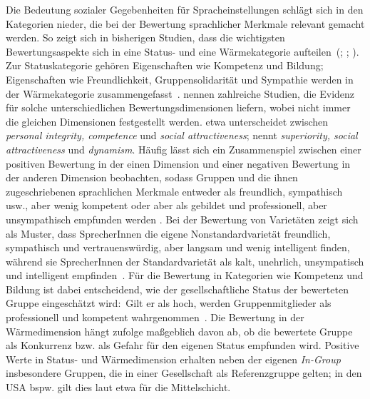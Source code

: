 Die Bedeutung sozialer Gegebenheiten für Spracheinstellungen schlägt sich in den Kategorien nieder, die bei der Bewertung sprachlicher Merkmale relevant gemacht werden.  
So zeigt sich in bisherigen Studien, dass die wichtigsten Bewertungsaspekte sich in eine Status- und eine Wärmekategorie aufteilen~(\citealp[s.][155]{Creber.1983}; \citealp[49]{Preston2004}; \citealp[]{Fiske.2002}). 
Zur Statuskategorie gehören Eigenschaften wie Kompetenz und Bildung;  
Eigenschaften wie Freundlichkeit, Gruppensolidarität und Sympathie werden in der Wärmekategorie zusammengefasst~\citep[s.][182]{Plewnia.2011}.
\citet[223--224]{Cargile.1994} nennen zahlreiche Studien, die Evidenz f{\"u}r solche unterschiedlichen Bewertungsdimensionen liefern, wobei nicht immer die gleichen Dimensionen festgestellt werden. \citet{Lambert.1967} etwa unterscheidet zwischen \textit{personal integrity, competence} und \textit{social attractiveness}; 
\citet[117]{Garrett.2007} nennt \textit{superiority, social attractiveness} und \textit{dynamism}. 
Häufig lässt sich ein Zusammenspiel zwischen einer positiven Bewertung in der einen Dimension und einer negativen Bewertung in der anderen Dimension beobachten, sodass Gruppen und die ihnen zugeschriebenen sprachlichen Merkmale entweder als freundlich, sympathisch usw., aber wenig kompetent oder aber als gebildet und professionell, aber unsympathisch empfunden werden \citep[s.][878--879]{Fiske.2002}.
Bei der Bewertung von Variet{\"a}ten zeigt sich als Muster, dass SprecherInnen die eigene  Nonstandardvariet{\"a}t freundlich, sympathisch und vertrauensw{\"u}rdig, aber langsam und wenig intelligent finden, w{\"a}hrend sie SprecherInnen der Standardvariet{\"a}t als kalt, unehrlich, unsympatisch und intelligent empfinden~\citep[s.][1687]{Preston2005}.
F{\"u}r die Bewertung in Kategorien wie Kompetenz und Bildung ist dabei entscheidend, wie der gesellschaftliche Status der bewerteten Gruppe eingesch{\"a}tzt wird:~Gilt er als hoch, werden Gruppenmitglieder als professionell und kompetent wahrgenommen~\citep[897]{Fiske.2002}.
Die Bewertung in der Wärmedimension hängt \citet[897]{Fiske.2002} zufolge maßgeblich davon ab, ob die bewertete Gruppe als Konkurrenz bzw. als Gefahr für den eigenen Status empfunden wird.
Positive Werte in Status- und Wärmedimension erhalten neben der eigenen \textit{In-Group} insbesondere Gruppen, die in einer Gesellschaft als Referenzgruppe gelten; in den USA bspw. gilt dies laut \citet[898]{Fiske.2002} etwa für die Mittelschicht.

